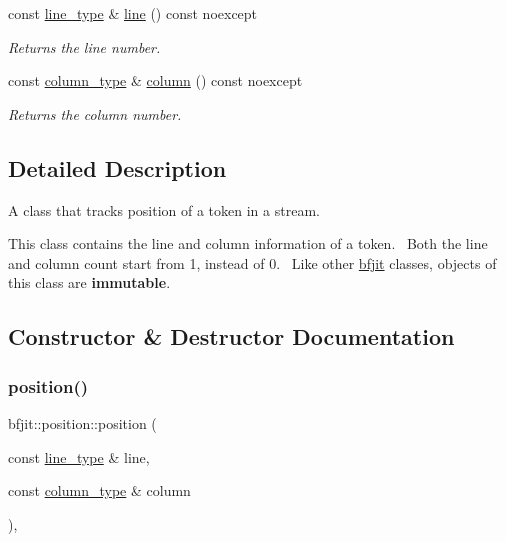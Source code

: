 \begin{DoxyCompactItemize}
\hypertarget{classbfjit_1_1position_a97065ff829263ae30ee20789d2a4d08f}{}\label{classbfjit_1_1position_a97065ff829263ae30ee20789d2a4d08f} 
const \hyperlink{classbfjit_1_1position_a6319989e5821e4a159ed1870e8ba656e}{line\+\_\+type} \& \hyperlink{classbfjit_1_1position_a97065ff829263ae30ee20789d2a4d08f}{line} () const noexcept
\begin{DoxyCompactList}\small\item\em Returns the line number. \end{DoxyCompactList}\item 
\hypertarget{classbfjit_1_1position_ad6bc7ed8fea430bbd3932c213cd86786}{}\label{classbfjit_1_1position_ad6bc7ed8fea430bbd3932c213cd86786} 
const \hyperlink{classbfjit_1_1position_a472af3de5d41775deff6293c0ab6450b}{column\+\_\+type} \& \hyperlink{classbfjit_1_1position_ad6bc7ed8fea430bbd3932c213cd86786}{column} () const noexcept
\begin{DoxyCompactList}\small\item\em Returns the column number. \end{DoxyCompactList}\end{DoxyCompactItemize}


\subsection{Detailed Description}
A class that tracks position of a token in a stream. 

This class contains the line and column information of a token.~\newline
Both the line and column count start from 1, instead of 0.~\newline
Like other \hyperlink{namespacebfjit}{bfjit} classes, objects of this class are {\bfseries immutable}. 

\subsection{Constructor \& Destructor Documentation}
\hypertarget{classbfjit_1_1position_a4e33b31f04bc22264a0e11e53658b823}{}\label{classbfjit_1_1position_a4e33b31f04bc22264a0e11e53658b823} 
\subsubsection{\texorpdfstring{position()}{position()}}
{\footnotesize\ttfamily bfjit\+::position\+::position (\begin{DoxyParamCaption}\item[{const \hyperlink{classbfjit_1_1position_a6319989e5821e4a159ed1870e8ba656e}{line\+\_\+type} \&}]{line,  }\item[{const \hyperlink{classbfjit_1_1position_a472af3de5d41775deff6293c0ab6450b}{column\+\_\+type} \&}]{column }\end{DoxyParamCaption})\hspace{0.3cm}{\ttfamily [explicit]}, {\ttfamily [noexcept]}}



